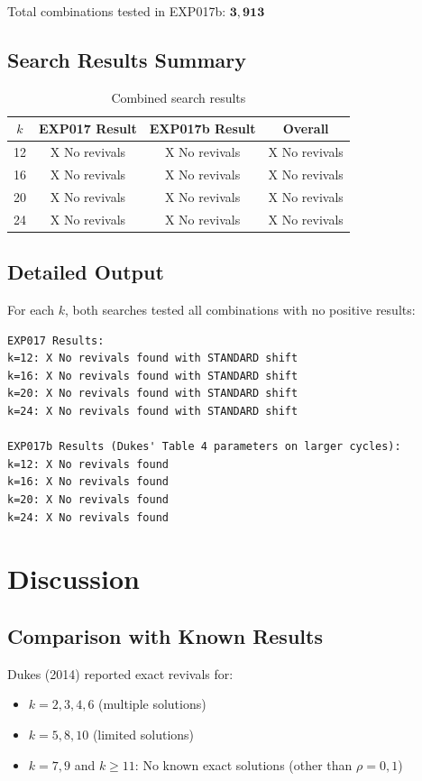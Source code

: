 \documentclass[12pt]{article}
\begin{document}
Total combinations tested in EXP017b: $\mathbf{3,913}$

\subsection{Search Results Summary}

\begin{table}[H]
\centering
\caption{Combined search results}
\label{tab:results}
\begin{tabular}{cccc}
\toprule
$k$ & EXP017 Result & EXP017b Result & Overall \\
\midrule
12 & X No revivals & X No revivals & X No revivals \\
16 & X No revivals & X No revivals & X No revivals \\
20 & X No revivals & X No revivals & X No revivals \\
24 & X No revivals & X No revivals & X No revivals \\
\bottomrule
\end{tabular}
\end{table}

\subsection{Detailed Output}

For each $k$, both searches tested all combinations with no positive results:

\begin{verbatim}
EXP017 Results:
k=12: X No revivals found with STANDARD shift
k=16: X No revivals found with STANDARD shift
k=20: X No revivals found with STANDARD shift
k=24: X No revivals found with STANDARD shift

EXP017b Results (Dukes' Table 4 parameters on larger cycles):
k=12: X No revivals found
k=16: X No revivals found
k=20: X No revivals found
k=24: X No revivals found
\end{verbatim}

\section{Discussion}

\subsection{Comparison with Known Results}

Dukes (2014) reported exact revivals for:
\begin{itemize}
    \item $k = 2, 3, 4, 6$ (multiple solutions)
    \item $k = 5, 8, 10$ (limited solutions)
    \item $k = 7, 9$ and $k \geq 11$: No known exact solutions (other than $\rho = 0, 1$)
\end{itemize}
\end{document}

